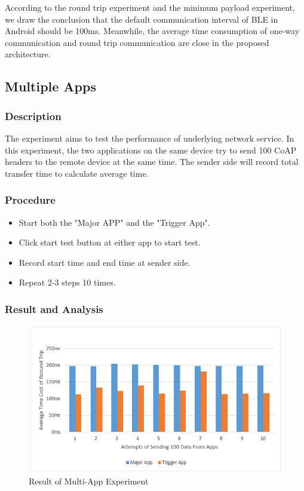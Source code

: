 \documentclass{Nan_Thesis}
\begin{document}
According to the round trip experiment and the minimum payload experiment, we draw the conclusion that the default communication interval of BLE in Android should be 100ms. Meanwhile, the average time consumption of one-way communication and round trip communication are close in the proposed architecture. 

\subsection{Multiple Apps}
\subsubsection{Description}
The experiment aims to test the performance of underlying network service. In this experiment, the two applications on the same device try to send 100 CoAP headers to the remote device at the same time. The sender side will record total transfer time to calculate average time.
\subsubsection{Procedure}

\begin{itemize}
  \item Start both the "Major APP" and the "Trigger App".
  \item Click start test button at either app to start test.
  \item Record start time and end time at sender side.
  \item Repeat 2-3 steps 10 times.
\end{itemize}

\newpage
\subsubsection{Result and Analysis} 
\begin{figure}[h]
  \centering 
      \includegraphics[scale=1]{pic/experiment4.png} 
  \caption{Result of Multi-App Experiment}
\end{figure}
\end{document}
